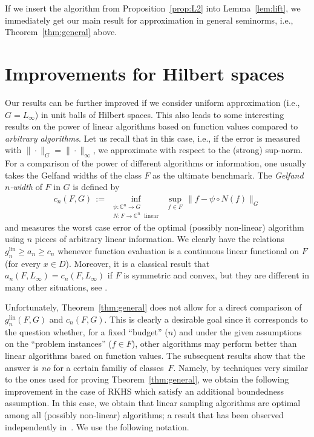 \documentclass[a4paper,12pt]{amsart}
\theoremstyle{definition}
\theoremstyle{remark}
\newcommand{\lin}{\ensuremath{\mathrm{lin}}}
\begin{document}
If we insert the algorithm from Proposition~\ref{prop:L2}
into Lemma~\ref{lem:lift}, we immediately get our main result for approximation in general seminorms, i.e., Theorem~\ref{thm:general} 
{above.}





\bigskip

\section{Improvements for Hilbert spaces}\label{sec:Hilbert}

Our results can be further improved if we consider 
{uniform approximation ({i.e., $G=L_\infty$}) in}
unit balls of 
Hilbert spaces. 
This also leads to some interesting results on 
the power of linear algorithms based on function values 
compared to \emph{arbitrary algorithms}. 
Let us recall that in this case, i.e., 
if the error is measured with $\|\cdot\|_G=\|\cdot\|_\infty$, we approximate 
with respect to the (strong) sup-norm. \\

For a comparison of the power of different algorithms or information, 
one usually takes the Gelfand widths of the class $F$ as the ultimate benchmark. The \emph{Gelfand $n$-width} of $F$ in $G$ is defined by
\begin{align*}
c_n(F, G) \,:=\,
\inf_{\substack{\psi\colon \mathbb{C}^n\to G\\ 
N\colon F\to\mathbb{C}^n \; \text{ linear}}}\; 
\sup_{f\in F}\, 
\big\|f - \psi\circ N(f) \big\|_{G}
\end{align*}
and measures the worst case error of the optimal (possibly non-linear) algorithm using $n$ pieces of arbitrary linear information.
{We clearly have the relations 
$g_n^\lin \ge a_n \ge c_n$ 
whenever function evaluation 
is a continuous linear functional on $F$ (for every $x\in D$). 
Moreover, 
it is a classical result that 
$a_n(F,L_\infty)=c_n(F,L_\infty)$ 
if $F$ is symmetric and convex, 
but they are different in many other situations, 
see \cite[Section~4.2.2]{NW1}.
}



Unfortunately,
Theorem~\ref{thm:general} does not allow for a direct comparison of $g_n^\lin(F,G)$ and $c_n(F,G)$. 
This is clearly a desirable goal
since it corresponds to the question
whether, 
for a fixed ``budget'' ($n$) and under the given 
assumptions on the ``problem instances'' ($f\in F$),
other algorithms may perform better 
than linear algorithms based on function values. 
The subsequent
results show
that the answer is \emph{no} for a certain familiy of classes~$F$.
%
Namely, by techniques very similar to the ones used for proving Theorem~\ref{thm:general}, we obtain the following 
improvement in the case of 
RKHS 
which satisfy an additional boundedness assumption. 
In this case, we obtain 
that linear sampling algorithms are optimal among all 
(possibly non-linear) algorithms; 
a result that has been observed independently in~\cite[Thm.~2.2]{GW23}. 
{We use the following notation.}
\end{document}
